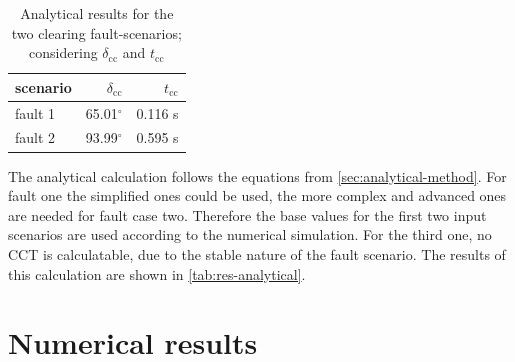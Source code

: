 \begin{table}
        \vspace{-12pt}
        \small
        \centering
        \caption[Analytical results for the two clearing fault-scenarios]{Analytical results for the two clearing fault-scenarios; considering $\delta_\mathrm{cc}$ and $t_\mathrm{cc}$}
        \label{tab:res-analytical}
        \vspace{12pt}
        \begin{tabular}{|l|r|r|}
                \hline
                \rowcolor{lightgray} scenario & $\delta_\mathrm{cc}$ & $t_\mathrm{cc}$  \\ \hline \hline
                fault 1              & 65.01$^\circ$        & 0.116 s                         \\ \hline
                fault 2              & 93.99$^\circ$        & 0.595 s \\ \hline
        \end{tabular}
\end{table}
The analytical calculation follows the equations from \autoref{sec:analytical-method}. For fault one the simplified ones could be used, the more complex and advanced ones are needed for fault case two. Therefore the base values for the first two input scenarios are used according to the numerical simulation. For the third one, no \acs{CCT} is calculatable, due to the stable nature of the fault scenario. The results of this calculation are shown in \autoref{tab:res-analytical}.


\section{Numerical results}

